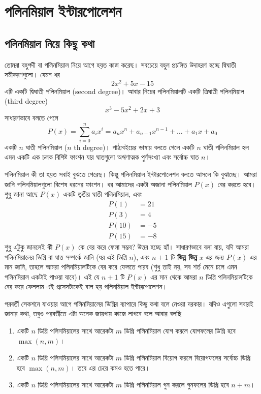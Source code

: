 \chapter{পলিনমিয়াল ইন্টারপোলেশন}

\section{পলিনমিয়াল নিয়ে কিছু কথা}
তোমরা বহুপদী বা পলিনমিয়াল নিয়ে আগে হয়ত কাজ করেছ। সবচেয়ে বহুল প্রচলিত উদাহরণ হচ্ছে দ্বিঘাতী সমীকরণগুলো। যেমন ধর 
$$2x^2 + 5x - 15$$
এটি একটি দ্বিঘাতী পলিনমিয়াল (second degree)। আবার নিচের পলিনমিয়ালটি একটি ত্রিঘাতী পলিনমিয়াল (third degree) 
$$x^3 - 5x^2 + 2x + 3$$
সাধারণভাবে বলতে গেলে 
$$P(x) = \sum_{i=0}^n a_{i} x^{i} = a_n x^n + a_{n - 1} x^{n - 1} + \dots + a_1 x + a_{0}$$ 
একটি $n$ ঘাতী পলিনমিয়াল ($n$ th degree)। পাঠ্যবইয়ের ভাষায় বলতে গেলে একটি $n$ ঘাতী পলিনমিয়াল হল এমন একটি এক চলক বিশিষ্ট ফাংশন যার ঘাতগুলো অঋণাত্মক পুর্ণসংখ্যা এবং সর্বোচ্চ ঘাত $n$।

পলিনমিয়াল কী তা হয়ত সবাই বুঝতে পেরেছ। কিন্তু পলিনমিয়াল ইন্টারপোলেশন বলতে আসলে কি বুঝাচ্ছে। আমরা জানি পলিনমিয়ালগুলো বিশেষ ধরনের ফাংশন। ধর আমাদের একটা অজানা পলিনমিয়াল $P(x)$ বের করতে হবে। শুধু জানা আছে  $P(x)$ একটি তৃতীয় ঘাতী পলিনমিয়াল, এবং 
\begin{align*}
P(1) & = 21 \\
P(3) & = 4 \\
P(10) & = -5 \\
P(15) &= -8
\end{align*}
শুধু এটুকু জানলেই কী $P(x)$ কে বের করে ফেলা সম্ভব? উত্তর হচ্ছে হ্যাঁ। সাধারণভাবে বলা যায়, যদি আমরা পলিনমিয়ালের ডিগ্রি বা ঘাত সম্পর্কে জানি (ধর এই ডিগ্রি $n$), এবং $n + 1$ টি \textbf{ভিন্ন ভিন্ন} $x$ এর জন্য $P(x)$ এর মান জানি, তাহলে আমরা পলিনমিয়ালটিকে বের করে ফেলতে পারব (শুধু তাই নয়, সব শর্ত মেনে চলে এমন পলিনমিয়াল একটাই পাওয়া যাবে)। এই যে $n + 1$ টি $P(x)$ এর মান থেকে আমরা $n$ ডিগ্রি পলিনমিয়ালটিকে বের করে ফেললাম এই প্রসেসটাকেই বাল হয় পলিনমিয়াল ইন্টারপোলেশন। 

পরবর্তী সেকশনে যাওয়ার আগে পলিনমিয়ালের ডিগ্রির ব্যাপারে কিছু কথা বলে নেওয়া দরকার। যদিও এগুলো সবারই জানার কথা, তবুও পরবর্তীতে এটা অনেক জায়গায় কাজে লাগবে বলে আবার বলছি 
\begin{enumerate}
\item একটি $n$ ডিগ্রি পলিনমিয়ালের সাথে আরেকটা $m$ ডিগ্রি পলিনমিয়াল যোগ করলে যোগফলের ডিগ্রি হবে $\max{(n, m)}$। 
\item একটি $n$ ডিগ্রি পলিনমিয়ালের সাথে আরেকটা $m$ ডিগ্রি পলিনমিয়াল বিয়োগ করলে বিয়োগফলের সর্বোচ্চ ডিগ্রি হবে $\max{(n, m)}$। তবে এর চেয়ে কমও হতে পারে।
\item একটি $n$ ডিগ্রি পলিনমিয়ালের সাথে আরেকটা $m$ ডিগ্রি পলিনমিয়াল গুন করলে গুনফলের ডিগ্রি হবে $n + m$।
\end{enumerate}

